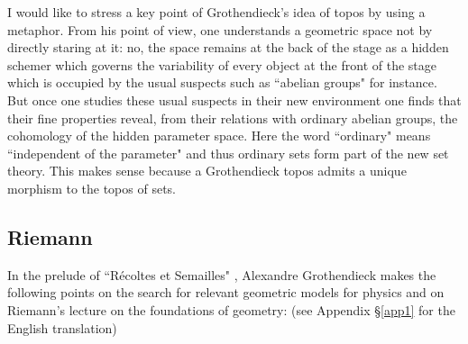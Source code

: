 \documentclass[12pt]{article}
\begin{document}
I would like to stress a key point of Grothendieck's idea of topos by using a metaphor. From his point of view, one understands a geometric space not by directly staring at it: no, the space remains at the back of the stage as a hidden schemer which governs the variability of every object at the front of the stage which is occupied by the usual suspects such as ``abelian groups" for instance. But once one studies these usual suspects in their new environment one finds that their fine properties reveal, from their relations with ordinary abelian groups,  the cohomology of the hidden parameter space.
Here the word ``ordinary" means ``independent of the parameter" and thus ordinary sets form part of the new set theory. This makes sense because a Grothendieck topos admits a unique morphism to the topos of sets. 

\subsection{Riemann}
In the prelude of ``R\' ecoltes et Semailles" \cite{RS}, Alexandre Grothendieck makes the following points on the search for relevant geometric models for physics and  on Riemann's lecture on the foundations of geometry: (see Appendix  \S \ref{app1} for the English translation)
\end{document}
